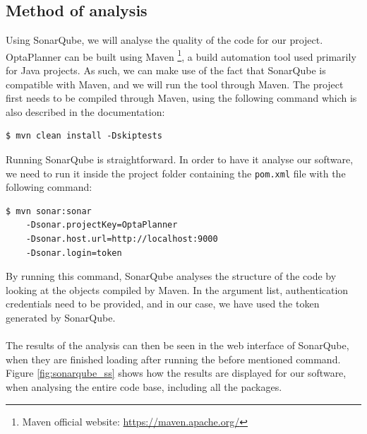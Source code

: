     \subsection{Method of analysis}
        Using SonarQube, we will analyse the quality of the code for our project.\\
        OptaPlanner can be built using Maven 
        \footnote{Maven official website: \url{https://maven.apache.org/}},
        a build automation tool used primarily for Java projects. As such, we can make use of the fact that SonarQube is compatible with Maven, and we will run the tool through Maven. The project first needs to be compiled through Maven, using the following command which is also described in the documentation:
        \begin{lstlisting}
$ mvn clean install -Dskiptests\end{lstlisting}
        Running SonarQube is straightforward. In order to have it analyse our software, we need to run it inside the project folder containing the \texttt{pom.xml} file with the following command:
        \begin{lstlisting}
$ mvn sonar:sonar 
    -Dsonar.projectKey=OptaPlanner 
    -Dsonar.host.url=http://localhost:9000 
    -Dsonar.login=token\end{lstlisting}
        By running this command, SonarQube analyses the structure of the code by looking at the objects compiled by Maven. 
        In the argument list, authentication credentials need to be provided, and in our case, we have used the token generated by SonarQube.\\\\
        The results of the analysis can then be seen in the web interface of SonarQube, when they are finished loading after running the before mentioned command. Figure \ref{fig:sonarqube_ss} shows how the results are displayed for our software, when analysing the entire code base, including all the packages.
